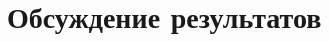 \documentclass[a4paper,12pt]{article}
\begin{document}
% 
% 

\section{Обсуждение результатов}
\end{document}

